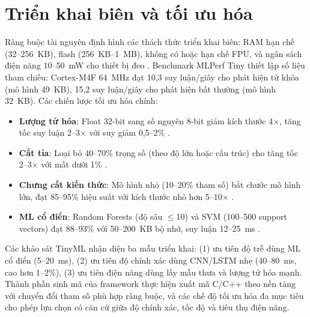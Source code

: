\section{Triển khai biên và tối ưu hóa}
Ràng buộc tài nguyên định hình các thách thức triển khai biên: RAM hạn chế (32--256~KB), flash (256~KB--1~MB), không có hoặc hạn chế FPU, và ngân sách điện năng 10--50~mW cho thiết bị đeo \cite{banbury2021mlperf, ray2023tinyml_survey}. Benchmark MLPerf Tiny \cite{banbury2021mlperf} thiết lập số liệu tham chiếu: Cortex-M4F 64~MHz đạt 10,3 suy luận/giây cho phát hiện từ khóa (mô hình 49~KB), 15,2 suy luận/giây cho phát hiện bất thường (mô hình 32~KB). Các chiến lược tối ưu hóa chính:
\begin{itemize}
    \item \textbf{Lượng tử hóa}: Float 32-bit sang số nguyên 8-bit giảm kích thước 4$\times$, tăng tốc suy luận 2--3$\times$ với suy giảm 0,5--2\% \cite{lin2022mcunet}.
    \item \textbf{Cắt tỉa}: Loại bỏ 40--70\% trọng số (theo độ lớn hoặc cấu trúc) cho tăng tốc 2--3$\times$ với mất dưới 1\% \cite{schmidhuber2015deep}.
    \item \textbf{Chưng cất kiến thức}: Mô hình nhỏ (10--20\% tham số) bắt chước mô hình lớn, đạt 85--95\% hiệu suất với kích thước nhỏ hơn 5--10$\times$ \cite{dutta2023tinyml_platforms}.
    \item \textbf{ML cổ điển}: Random Forests (độ sâu $\leq$10) và SVM (100--500 support vectors) đạt 88--93\% với 50--200~KB bộ nhớ, suy luận 12--25~ms \cite{wang2024har_comparative}.
\end{itemize}
Các khảo sát TinyML \cite{ray2023tinyml_survey, dutta2023tinyml_platforms} nhận diện ba mẫu triển khai: (1) ưu tiên độ trễ dùng ML cổ điển (5--20~ms), (2) ưu tiên độ chính xác dùng CNN/LSTM nhẹ (40--80~ms, cao hơn 1--2\%), (3) ưu tiên điện năng dùng lấy mẫu thưa và lượng tử hóa mạnh. Thành phần sinh mã của framework thực hiện xuất mã C/C++ theo nền tảng với chuyển đổi tham số phù hợp ràng buộc, và các chế độ tối ưu hóa đa mục tiêu cho phép lựa chọn có căn cứ giữa độ chính xác, tốc độ và tiêu thụ điện năng.

